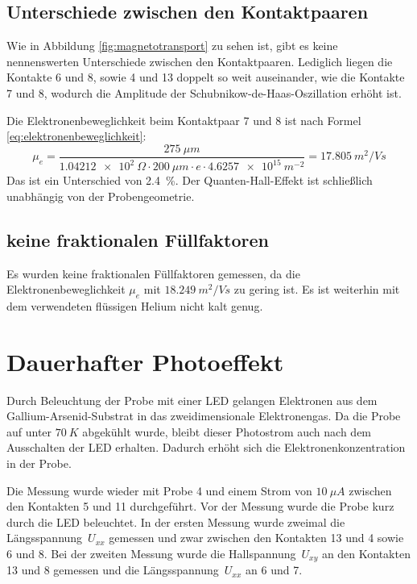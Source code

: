 \documentclass[a4paper]{article}
\begin{document}
\subsection*{Unterschiede zwischen den Kontaktpaaren}

Wie in Abbildung \ref{fig:magnetotransport} zu sehen ist,
gibt es keine nennenswerten Unterschiede zwischen den Kontaktpaaren.
Lediglich liegen die Kontakte 6 und 8, sowie 4 und 13
doppelt so weit auseinander,
wie die Kontakte 7 und 8, wodurch die Amplitude der
Schubnikow-de-Haas-Oszillation erhöht ist.

Die Elektronenbeweglichkeit beim Kontaktpaar 7 und 8 ist
nach Formel \eqref{eq:elektronenbeweglichkeit}:
\begin{equation*}
\mu_e = \frac{ \SI{275}{\mu m} }
 	     {\SI{1.04212e2}{\Omega} \cdot \SI{200}{\mu m} \cdot e \cdot \SI{4.6257e15}{m^{-2}}}
      = \SI{17.805}{m^2 / Vs}
\end{equation*}
Das ist ein Unterschied von \SI{2.4}{\%}.
Der Quanten-Hall-Effekt ist schließlich unabhängig von der Probengeometrie.

\subsection*{keine fraktionalen Füllfaktoren}
Es wurden keine fraktionalen Füllfaktoren gemessen,
da die Elektronenbeweglichkeit $\mu_e$ mit $\SI{18.249}{m^2 / Vs}$
zu gering ist.
Es ist weiterhin mit dem verwendeten flüssigen Helium nicht kalt genug.

\newpage

\section*{Dauerhafter Photoeffekt}
Durch Beleuchtung der Probe mit einer LED gelangen Elektronen
aus dem Gallium-Arsenid-Substrat in das zweidimensionale Elektronengas.
Da die Probe auf unter $\SI{70}{K}$ abgekühlt wurde,
bleibt dieser Photostrom auch nach dem Ausschalten der LED erhalten.
Dadurch erhöht sich die Elektronenkonzentration in der Probe.

Die Messung wurde wieder mit Probe 4 und einem Strom von $\SI{10}{\mu A}$
zwischen den Kontakten 5 und 11 durchgeführt.
Vor der Messung wurde die Probe kurz durch die LED beleuchtet.
In der ersten Messung wurde zweimal die Längsspannung~$U_{xx}$ gemessen und
zwar zwischen den Kontakten 13 und 4 sowie 6 und 8.
Bei der zweiten Messung wurde die Hallspannung~$U_{xy}$ an den
Kontakten 13 und 8 gemessen und die Längsspannung~$U_{xx}$ an 6 und 7.
\end{document}
